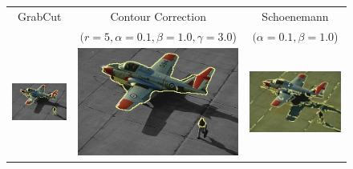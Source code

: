 \documentclass[smallextended]{svjour3}       %
\begin{document}
{{\begin{figure}[hp!]
	\center
	\begin{tabular}{ccc}
		GrabCut & Contour Correction & Schoenemann \\
		& $(r=5, \alpha=0.1, \beta=1.0, \gamma=3.0$) & $(\alpha=0.1, \beta=1.0$)\\
		\includegraphics[scale=0.2]{images/segmentation/bc/airplane2/gc-seg.png} &
		\includegraphics[scale=0.2]{images/segmentation/bc/airplane2/corrected-seg.png} &					\includegraphics[scale=0.2]{images/segmentation/schoenemann/airplane2/airplane2-seg.png}\\									

\end{tabular}
\end{figure}}}
\end{document}
